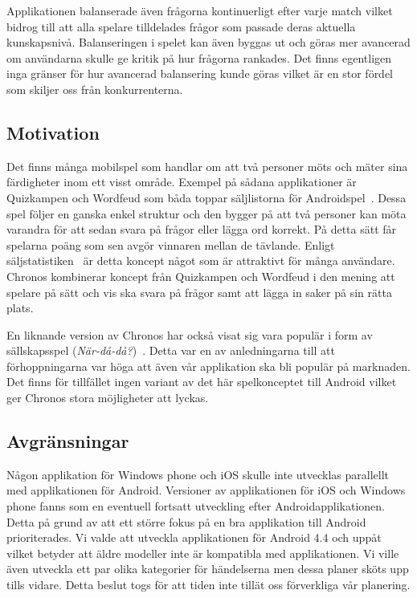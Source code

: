 \documentclass[a4paper, 11pt]{article}
\begin{document}
Applikationen balanserade även frågorna kontinuerligt efter varje match vilket bidrog till att alla spelare tilldelades frågor som passade deras aktuella kunskapsnivå. Balanseringen i spelet kan även byggas ut och göras mer avancerad om användarna skulle ge kritik på hur frågorna rankades. Det finns egentligen inga gränser för hur avancerad balansering kunde göras vilket är en stor fördel som skiljer oss från konkurrenterna.


\subsection{Motivation}
Det finns många mobilspel som handlar om att två personer möts och mäter sina färdigheter inom ett visst område. Exempel på sådana applikationer är Quizkampen och Wordfeud som båda toppar säljlistorna för Androidspel~\cite{appsalesrating}. Dessa spel följer en ganska enkel struktur och den bygger på att två personer kan möta varandra för att sedan svara på frågor eller lägga ord korrekt. På detta sätt får spelarna poäng som sen avgör vinnaren mellan de tävlande. Enligt säljstatistiken~\cite{appsalesrating} är detta koncept något som är attraktivt för många användare. Chronos kombinerar koncept från Quizkampen och Wordfeud i den mening att spelare på sätt och vis ska svara på frågor samt att lägga in saker på sin rätta plats. 

En liknande version av Chronos har också visat sig vara populär i form av sällskapsspel (\textit{När-då-då?})~\cite{nardada}. Detta var en av anledningarna till att förhoppningarna var höga att även vår applikation ska bli populär på marknaden. Det finns för tillfället ingen variant av det här spelkonceptet till Android vilket ger Chronos stora möjligheter att lyckas.

\subsection{Avgränsningar}
Någon applikation för Windows phone och iOS skulle inte utvecklas parallellt med applikationen för Android. Versioner av applikationen för iOS och Windows phone fanns som en eventuell fortsatt utveckling efter Androidapplikationen. Detta på grund av att ett större fokus på en bra applikation till Android prioriterades. Vi valde att utveckla applikationen för Android 4.4 och uppåt vilket betyder att äldre modeller inte är kompatibla med applikationen.
Vi ville även utveckla ett par olika kategorier för händelserna men dessa planer sköts upp tills vidare. Detta beslut togs för att tiden inte tillät oss förverkliga vår planering.
\end{document}
